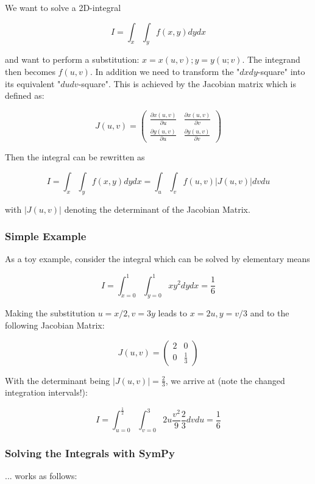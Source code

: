 
We want to solve a 2D-integral

\[ I = \int_x \int_y f(x,y) dy dx \]

and want to perform a substitution: $x = x(u, v); y = y(u; v)$. The integrand then becomes $f(u,v)$. In addition we need to transform the "$dx dy$-square" into its equivalent "$du dv$-square". This is
achieved by the Jacobian matrix which is defined as:

\[ J(u,v) = \left( \begin{array}{cc}
\frac{\partial x(u,v)}{\partial u} & \frac{\partial x(u,v)}{\partial v}  \\
\frac{\partial y(u,v)}{\partial u} & \frac{\partial y(u,v)}{\partial v} 
\end{array} \right) \]

Then the integral can be rewritten as

\[ I = \int_x \int_y f(x,y) dy dx = \int_u \int_v f(u,v) |J(u,v)| dv du \]

with $|J(u,v)|$ denoting the determinant of the Jacobian Matrix.

\subsubsection{Simple Example}

As a toy example, consider the integral which can be solved by
elementary means

\[ I = \int_{x=0}^1 \int_{y=0}^1 x y^2 dy dx = \frac{1}{6}\]

Making the substitution $u=x/2, v=3y$ leads to $x=2u, y=v/3$ and to the following Jacobian Matrix:

\[J(u,v) = \left( \begin{array}{cc} 2 & 0 \\ 0 & \frac{1}{3} \end{array} \right) \]

With the determinant being
$|J(u,v)| = \frac{2}{3}$, we arrive at (note the changed integration intervals!):

\[I = \int_{u=0}^{\frac{1}{2}} \int_{v=0}^3 2u \frac{v^2}{9} \frac{2}{3} dv du = \frac{1}{6}\]

\subsubsection{Solving the Integrals with SymPy}

... works as follows:

